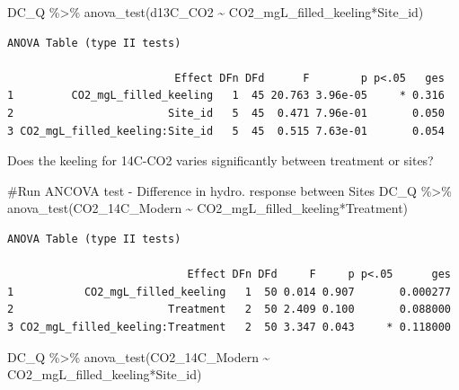 \documentclass[
  letterpaper,
  DIV=11,
  numbers=noendperiod]{scrartcl}
\newenvironment{Shaded}{\begin{snugshade}}{\end{snugshade}}
\newcommand{\CommentTok}[1]{\textcolor[rgb]{0.37,0.37,0.37}{#1}}
\newcommand{\FunctionTok}[1]{\textcolor[rgb]{0.28,0.35,0.67}{#1}}
\newcommand{\NormalTok}[1]{\textcolor[rgb]{0.00,0.23,0.31}{#1}}
\newcommand{\SpecialCharTok}[1]{\textcolor[rgb]{0.37,0.37,0.37}{#1}}
\begin{document}
\begin{Shaded}
\begin{Highlighting}[]
\NormalTok{DC\_Q }\SpecialCharTok{\%\textgreater{}\%} \FunctionTok{anova\_test}\NormalTok{(d13C\_CO2 }\SpecialCharTok{\textasciitilde{}}\NormalTok{ CO2\_mgL\_filled\_keeling}\SpecialCharTok{*}\NormalTok{Site\_id)}
\end{Highlighting}
\end{Shaded}

\begin{verbatim}
ANOVA Table (type II tests)

                          Effect DFn DFd      F        p p<.05   ges
1         CO2_mgL_filled_keeling   1  45 20.763 3.96e-05     * 0.316
2                        Site_id   5  45  0.471 7.96e-01       0.050
3 CO2_mgL_filled_keeling:Site_id   5  45  0.515 7.63e-01       0.054
\end{verbatim}

Does the keeling for 14C-CO2 varies significantly between treatment or
sites?

\begin{Shaded}
\begin{Highlighting}[]
\CommentTok{\#Run ANCOVA test {-} Difference in hydro. response between Sites}
\NormalTok{DC\_Q }\SpecialCharTok{\%\textgreater{}\%} \FunctionTok{anova\_test}\NormalTok{(CO2\_14C\_Modern }\SpecialCharTok{\textasciitilde{}}\NormalTok{ CO2\_mgL\_filled\_keeling}\SpecialCharTok{*}\NormalTok{Treatment)}
\end{Highlighting}
\end{Shaded}

\begin{verbatim}
ANOVA Table (type II tests)

                            Effect DFn DFd     F     p p<.05      ges
1           CO2_mgL_filled_keeling   1  50 0.014 0.907       0.000277
2                        Treatment   2  50 2.409 0.100       0.088000
3 CO2_mgL_filled_keeling:Treatment   2  50 3.347 0.043     * 0.118000
\end{verbatim}

\begin{Shaded}
\begin{Highlighting}[]
\NormalTok{DC\_Q }\SpecialCharTok{\%\textgreater{}\%} \FunctionTok{anova\_test}\NormalTok{(CO2\_14C\_Modern }\SpecialCharTok{\textasciitilde{}}\NormalTok{ CO2\_mgL\_filled\_keeling}\SpecialCharTok{*}\NormalTok{Site\_id)}
\end{Highlighting}
\end{Shaded}
\end{document}
